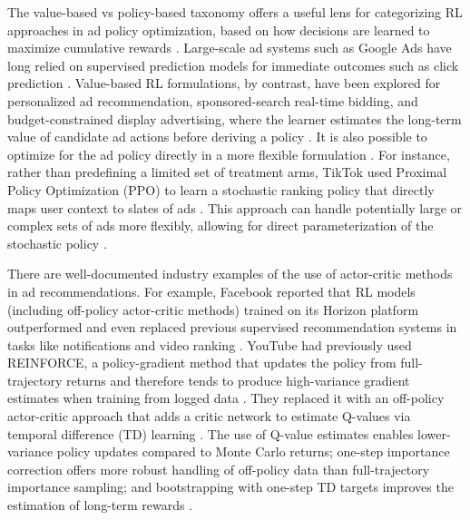\documentclass[manuscript,review,screen]{acmart}
\begin{document}
The value-based vs policy-based taxonomy offers a useful lens for categorizing RL approaches in ad policy optimization, based on how decisions are learned to maximize cumulative rewards \cite{lin2023survey, zhao2021dear}. Large-scale ad systems such as Google Ads have long relied on supervised prediction models for immediate outcomes such as click prediction \cite{mcmahan2013ad}. Value-based RL formulations, by contrast, have been explored for personalized ad recommendation, sponsored-search real-time bidding, and budget-constrained display advertising, where the learner estimates the long-term value of candidate ad actions before deriving a policy \cite{Theocharous-2015, zhao2018deep, wu2018budget}. It is also possible to optimize for the ad policy directly in a more flexible formulation \cite{williams1992simple}. For instance, rather than predefining a limited set of treatment arms, TikTok used Proximal Policy Optimization (PPO) to learn a stochastic ranking policy that directly maps user context to slates of ads \cite{zhao2021dear}. This approach can handle potentially large or complex sets of ads more flexibly, allowing for direct parameterization of the stochastic policy \cite{ie2019slateq, dulac2021challenges}.

There are well-documented industry examples of the use of actor-critic methods in ad recommendations. For example, Facebook reported that RL models (including off-policy actor-critic methods) trained on its Horizon platform outperformed and even replaced previous supervised recommendation systems in tasks like notifications and video ranking \cite{gauci2018horizon}. YouTube had previously used REINFORCE, a policy-gradient method that updates the policy from full-trajectory returns and therefore tends to produce high-variance gradient estimates when training from logged data \cite{williams1992simple, chen2022off}. They replaced it with an off-policy actor-critic approach that adds a critic network to estimate Q-values via temporal difference (TD) learning \cite{chen2022off}. The use of Q-value estimates enables lower-variance policy updates compared to Monte Carlo returns; one-step importance correction offers more robust handling of off-policy data than full-trajectory importance sampling; and bootstrapping with one-step TD targets improves the estimation of long-term rewards \cite{chen2022off}.
\end{document}
